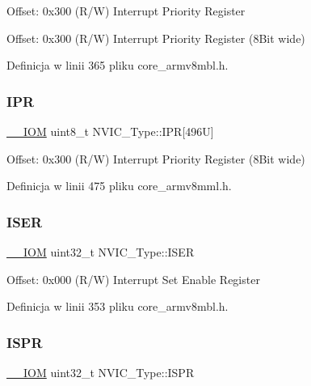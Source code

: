Offset\+: 0x300 (R/W) Interrupt Priority Register

Offset\+: 0x300 (R/W) Interrupt Priority Register (8\+Bit wide) 

Definicja w linii 365 pliku core\+\_\+armv8mbl.\+h.

\mbox{\label{struct_n_v_i_c___type_adfd45d2d45654c4e775017800f33e9a3}} 
\subsubsection{\texorpdfstring{I\+PR}{IPR}\hspace{0.1cm}{\footnotesize\ttfamily [2/2]}}
{\footnotesize\ttfamily \hyperlink{core__sc300_8h_ab6caba5853a60a17e8e04499b52bf691}{\+\_\+\+\_\+\+I\+OM} uint8\+\_\+t N\+V\+I\+C\+\_\+\+Type\+::\+I\+PR\mbox{[}496\+U\mbox{]}}

Offset\+: 0x300 (R/W) Interrupt Priority Register (8\+Bit wide) 

Definicja w linii 475 pliku core\+\_\+armv8mml.\+h.

\mbox{\label{struct_n_v_i_c___type_a06726c729c5557701defc4d6b5d8f9f6}} 
\subsubsection{\texorpdfstring{I\+S\+ER}{ISER}}
{\footnotesize\ttfamily \hyperlink{core__sc300_8h_ab6caba5853a60a17e8e04499b52bf691}{\+\_\+\+\_\+\+I\+OM} uint32\+\_\+t N\+V\+I\+C\+\_\+\+Type\+::\+I\+S\+ER}

Offset\+: 0x000 (R/W) Interrupt Set Enable Register 

Definicja w linii 353 pliku core\+\_\+armv8mbl.\+h.

\mbox{\label{struct_n_v_i_c___type_a288bc5e8b844a531a6ecdcc8dbcb8050}} 
\subsubsection{\texorpdfstring{I\+S\+PR}{ISPR}}
{\footnotesize\ttfamily \hyperlink{core__sc300_8h_ab6caba5853a60a17e8e04499b52bf691}{\+\_\+\+\_\+\+I\+OM} uint32\+\_\+t N\+V\+I\+C\+\_\+\+Type\+::\+I\+S\+PR}

